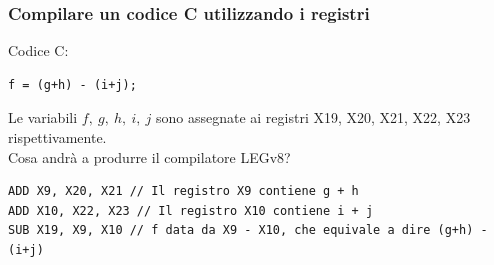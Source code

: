 \documentclass[12pt,a4paper]{article}
\begin{document}
\subsubsection{Compilare un codice C utilizzando i registri}
Codice C: 
\begin{center}
\begin{minipage}{.2\linewidth}
\begin{verbatim}
f = (g+h) - (i+j);
\end{verbatim}
\end{minipage}
\end{center}
Le variabili $f,\ g,\ h,\ i,\ j$ sono assegnate ai registri X19, 	X20, X21, X22, X23 rispettivamente.\\
Cosa andrà a produrre il compilatore LEGv8?
\begin{verbatim}
ADD X9, X20, X21 // Il registro X9 contiene g + h
ADD X10, X22, X23 // Il registro X10 contiene i + j
SUB X19, X9, X10 // f data da X9 - X10, che equivale a dire (g+h) - (i+j)
\end{verbatim}
\end{document}
